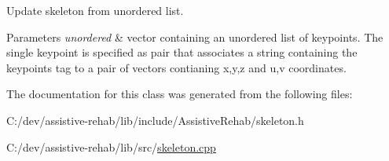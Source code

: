 Update skeleton from unordered list. 


\begin{DoxyParams}{Parameters}
{\em unordered} & vector containing an unordered list of keypoints. The single keypoint is specified as pair that associates a string containing the keypoint\textquotesingle{}s tag to a pair of vectors contianing x,y,z and u,v coordinates. \\
\hline
\end{DoxyParams}


The documentation for this class was generated from the following files\+:\begin{DoxyCompactItemize}
\item 
C\+:/dev/assistive-\/rehab/lib/include/\+Assistive\+Rehab/skeleton.\+h\item 
C\+:/dev/assistive-\/rehab/lib/src/\mbox{\hyperlink{skeleton_8cpp}{skeleton.\+cpp}}\end{DoxyCompactItemize}
